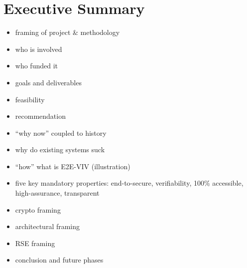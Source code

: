 \chapter{Executive Summary}
\label{chapter:executive_summary}

\begin{itemize}
\item framing of project \& methodology
\item who is involved
\item who funded it
\item goals and deliverables
\item feasibility
\item recommendation
\item ``why now'' coupled to history
\item why do existing systems suck
\item ``how'' what is E2E-VIV (illustration)
\item five key mandatory properties: end-to-secure, verifiability,
  100\% accessible, high-assurance, transparent
\item crypto framing
\item architectural framing
\item RSE framing
\item conclusion and future phases
\end{itemize}
